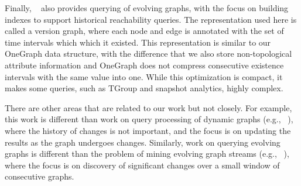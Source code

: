Finally, ~\cite{Semertzidis2015} also provides querying of evolving
graphs, with the focus on building indexes to support historical
reachability queries.  The representation used here is called a
version graph, where each node and edge is annotated with the set of
time intervals which which it existed.  This representation is similar
to our OneGraph data structure, with the difference that we also store
non-topological attribute information and OneGraph does not compress
consecutive existence intervals with the same value into one.  While
this optimization is compact, it makes some queries, such as TGroup
and snapshot analytics, highly complex.

There are other areas that are related to our work but not closely.
For example, this work is different than work on query processing of
dynamic graphs (e.g., ~\cite{Mondal2012}), where the history of
changes is not important, and the focus is on updating the results as
the graph undergoes changes.  Similarly, work on querying evolving
graphs is different than the problem of mining evolving graph streams
(e.g., ~\cite{Liu2010}), where the focus is on discovery of
significant changes over a small window of consecutive graphs.
